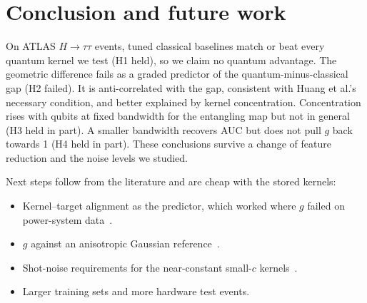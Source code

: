 \documentclass[10pt,a4paper]{article}
\begin{document}
\section{Conclusion and future work}
On ATLAS $H\to\tau\tau$ events, tuned classical baselines match or beat every quantum kernel we test (H1 held), so we
claim no quantum advantage. The geometric difference fails as a graded predictor of the quantum-minus-classical gap
(H2 failed). It is anti-correlated with the gap, consistent with Huang et al.'s necessary condition, and better
explained by kernel concentration. Concentration rises with qubits at fixed bandwidth for the entangling map but not
in general (H3 held in part). A smaller bandwidth recovers AUC but does not pull $g$ back towards 1 (H4 held in part).
These conclusions survive a change of feature reduction and the noise levels we studied.

Next steps follow from the literature and are cheap with the stored kernels:
\begin{itemize}
\item Kernel--target alignment as the predictor, which worked where $g$ failed on power-system data~\cite{islam2026power}.
\item $g$ against an anisotropic Gaussian reference~\cite{tekeli2026zz}.
\item Shot-noise requirements for the near-constant small-$c$ kernels~\cite{miroszewski2024shots}.
\item Larger training sets and more hardware test events.
\end{itemize}



\end{document}
